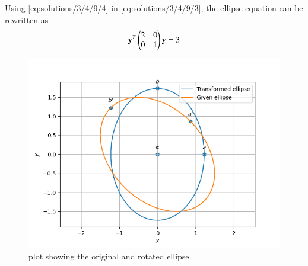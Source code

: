 Using \eqref{eq:solutions/3/4/9/4} in \eqref{eq:solutions/3/4/9/3}, the ellipse equation can be rewritten as
\begin{align}
     \mathbf{y}^T\begin{pmatrix}2&0\\0&1\end{pmatrix}\mathbf{y}=3
\end{align}
\begin{figure}[!ht]
\centering
\includegraphics[width=\columnwidth]{./solutions/3/4/9/plot.png}
\caption{plot showing the original and rotated ellipse}
\label{eq:solutions/3/4/9/Fig}
\end{figure}



